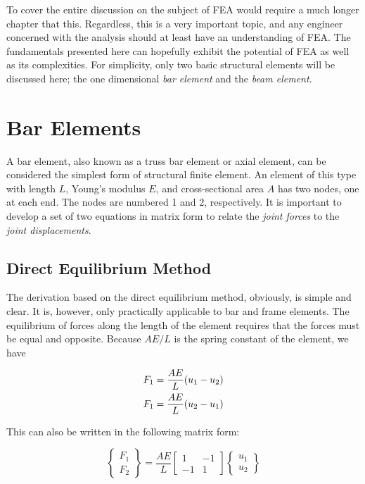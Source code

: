 \documentclass[a4paper,openany,12pt]{book}
\begin{document}
{{To cover the entire discussion on the subject of FEA would require a
much longer chapter that this. Regardless, this is a very important
topic, and any engineer concerned with the analysis should at least have
an understanding of FEA. The fundamentals presented here can hopefully
exhibit the potential of FEA as well as its complexities. For
simplicity, only two basic structural elements will be discussed here;
the one dimensional \emph{bar element} and the \emph{beam element}.

\section{Bar Elements}
\label{sec:org452e256}
A bar element, also known as a truss bar element or axial element, can
be considered the simplest form of structural finite element. An element
of this type with length \(L\), Young's modulus \(E\), and cross-sectional
area \(A\) has two nodes, one at each end. The nodes are numbered 1 and 2,
respectively. It is important to develop a set of two equations in
matrix form to relate the \emph{joint forces} to the \emph{joint displacements}.

\subsection{Direct Equilibrium Method}
\label{sec:org86be796}
The derivation based on the direct equilibrium method, obviously, is
simple and clear. It is, however, only practically applicable to bar and
frame elements. The equilibrium of forces along the length of the
element requires that the forces must be equal and opposite. Because
\(AE / L\) is the spring constant of the element, we have

$$\begin{gathered}
    F_1 = \frac{AE}{L}(u_1 - u_2) \hfill \\
    F_1 = \frac{AE}{L}(u_2 - u_1) \hfill \\ 
  \end{gathered}$$

This can also be written in the following matrix form:

$$\left\{
    \begin{array}{*{20}{c}}
      F_1 \\ 
      F_2 
    \end{array} \right\} = \frac{AE}{L}\left[
    \begin{array}{*{20}{c}}
      1 & -1 \\ 
     -1 & 1 
   \end{array} \right]\left\{
    \begin{array}{*{20}{c}}
    u_1 \\ 
    u_2 
   \end{array} \right\}$$

}}
\end{document}
